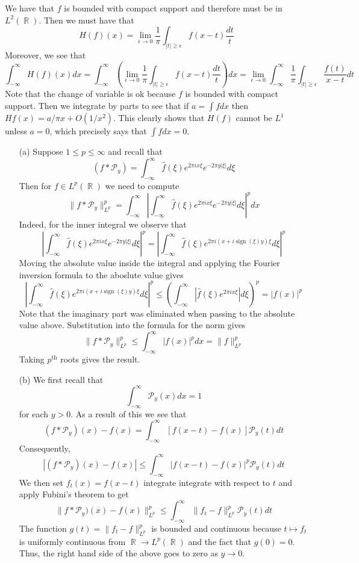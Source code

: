 \documentclass[11pt]{article}
\DeclareMathOperator{\R}{\mathbb{R}}
\newcommand{\exercise}[1]{\noindent{\textbf{Exercise #1:}}}
\newcommand{\lpnorm}[2]{\|#1\|_{L^{#2}}}
\begin{document}
\exercise{2.7.7}

We have that $f$ is bounded with compact support and therefore must be
in $L^2(\R)$. Then we must have that
\[
H(f)(x) = \lim_{\epsilon \to 0} \frac{1}{\pi}\int_{|t| \geq \epsilon}
f(x-t) \frac{dt}{t}
\]
Moreover, we see that
\[
\int_{-\infty}^\infty H(f)(x)dx = \int_{-\infty}^\infty
\left(\lim_{\epsilon\to 0} \frac{1}{\pi}\int_{|t| \geq \epsilon} f(x-t)
\frac{dt}{t}\right)dx = \lim_{\epsilon\to 0}\int_{-\infty}^\infty
\frac{1}{\pi}\int_{|t| \geq \epsilon} \frac{f(t)}{x-t}dt
\]
Note that the change of variable is ok because $f$ is bounded with
compact support. Then we integrate by parts to see that if $a = \int
fdx$ then $Hf(x) = a/\pi x + O(1/x^2)$. This clearly shows that $H(f)$
cannot be $L^1$ unless $a = 0$, which precisely says that $\int fdx =
0$. 

\exercise{2.7.10}
\begin{enumerate}
\item[(a)] Suppose $1 \leq p \leq \infty$ and recall that
  \[
  (f \ast \mathcal{P}_y) = \int_{-\infty}^\infty \hat{f}(\xi)e^{2\pi i
    x\xi}e^{-2\pi y|\xi|}d\xi
  \]
  Then for $f \in L^p(\R)$ we need to compute
  \[
  \lpnorm{f\ast \mathcal{P}_y}{p}^p =
  \int_{-\infty}^\infty\left|\int_{-\infty}^\infty \hat{f}(\xi)e^{2\pi
      i x\xi}e^{-2\pi y|\xi|}d\xi\right|^pdx
  \]
  Indeed, for the inner integral we observe that
  \[
  \left|\int_{-\infty}^\infty \hat{f}(\xi)e^{2\pi i x\xi}e^{-2\pi
      y|\xi|}d\xi\right|^p = \left|\int_{-\infty}^\infty
    \hat{f}(\xi)e^{2\pi i(x+i\mathrel{\text{sign}}(\xi)y)\xi}d\xi \right|^p
  \]
  Moving the absolute value inside the integral and applying the
  Fourier inversion formula to the aboslute value gives
  \[
  \left|\int_{-\infty}^\infty \hat{f}(\xi)e^{2\pi
      i(x+i\mathrel{\text{sign}}(\xi)y)\xi}d\xi \right|^p \leq
  \left(\int_{-\infty}^\infty \left|\hat{f}(\xi)e^{2\pi
      ix\xi}\right|d\xi\right)^p = |f(x)|^p
  \]
  Note that the imaginary part was eliminated when passing to the
  absolute value above. Substitution into the formula for the norm
  gives
  \[
  \lpnorm{f \ast \mathcal{P}_y}{p}^p \leq \int_{-\infty}^\infty
  |f(x)|^pdx = \lpnorm{f}{p}^p
  \]
  Taking $p^{\text{th}}$ roots gives the result.
\item[(b)] We first recall that
  \[
  \int_{-\infty}^\infty \mathcal{P}_y(x)dx = 1
  \]
  for each $y > 0$. As a result of this we see that
  \[
  (f \ast \mathcal{P}_y)(x) - f(x) = \int_{-\infty}^\infty [f(x-t) -
  f(x)]\mathcal{P}_y(t)dt
  \]
  Consequently,
  \[
  |(f \ast \mathcal{P}_y)(x) - f(x)| \leq \int_{-\infty}^\infty
  |f(x-t) - f(x)|^p\mathcal{P}_y(t)dt
  \]
  We then set $f_t(x) = f(x-t)$ integrate integrate with respect to $t$ and apply Fubini's
  theorem to get
  \[
  \lpnorm{f \ast \mathcal{P}_y)(x) - f(x)}{p}^p \leq
  \int_{-\infty}^\infty \lpnorm{f_t - f}{p}^p\mathcal{P}_y(t)dt
  \]
  The function $g(t) = \lpnorm{f_t - f}{p}^p$ is bounded and
  continuous because $t \mapsto f_t$ is uniformly continuous from $\R
  \to L^p(\R)$ and the fact that $g(0) = 0$. Thus, the right hand side
  of the above goes to zero as $y \to 0$.
\end{enumerate}
\end{document}
